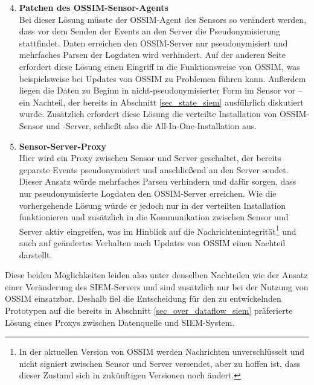 \begin{enumerate}
\setcounter{enumi}{3}

\item \textbf{Patchen des OSSIM-Sensor-Agents}\\
  Bei dieser Lösung müsste der OSSIM-Agent des Sensors so verändert werden, dass vor dem Senden der Events an den Server die Pseudonymisierung stattfindet. Daten erreichen den OSSIM-Server nur pseudonymisiert und mehrfaches Parsen der Logdaten wird verhindert. Auf der anderen Seite erfordert diese Lösung einen Eingriff in die Funktionsweise von OSSIM, was beispielsweise bei Updates von OSSIM zu Problemen führen kann. Außerdem liegen die Daten zu Beginn in nicht-pseudonymisierter Form im Sensor vor -- ein Nachteil, der bereits in Abschnitt \ref{sec_state_siem} ausführlich diskutiert wurde. Zusätzlich erfordert diese Lösung die verteilte Installation von OSSIM-Sensor und -Server, schließt also die All-In-One-Installation aus.
  
\item \textbf{Sensor-Server-Proxy}\\
  Hier wird ein Proxy zwischen Sensor und Server geschaltet, der bereits geparste Events pseudonymisiert und anschließend an den Server sendet. Dieser Ansatz würde mehrfaches Parsen verhindern und dafür sorgen, dass nur pseudonymisierte Logdaten den OSSIM-Server erreichen. Wie die vorhergehende Lösung würde er jedoch nur in der verteilten Installation funktionieren und zusätzlich in die Kommunikation zwischen Sensor und Server aktiv eingreifen, was im Hinblick auf die Nachrichtenintegrität\footnote{
    In der aktuellen Version von OSSIM werden Nachrichten unverschlüsselt und nicht signiert zwischen Sensor und Server versendet, aber zu hoffen ist, dass dieser Zustand sich in zukünftigen Versionen noch ändert.
  } und auch auf geändertes Verhalten nach Updates von OSSIM einen Nachteil darstellt.
\end{enumerate}

%

Diese beiden Möglichkeiten leiden also unter denselben Nachteilen wie der Ansatz einer Veränderung des SIEM-Servers und sind zusätzlich nur bei der Nutzung von OSSIM einsatzbar.
Deshalb fiel die Entscheidung für den zu entwickelnden Prototypen auf die bereits in Abschnitt \ref{sec_over_dataflow_siem} präferierte Lösung eines Proxys zwischen Datenquelle und SIEM-System.

